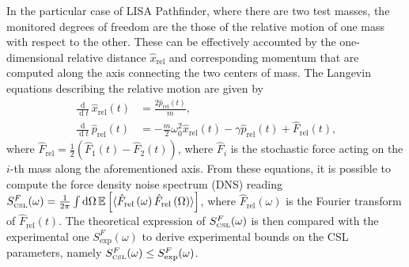 \documentclass[aps,twocolumn,pra,superscriptaddress]{revtex4-2}
\newcommand\D{\operatorname{d}\!}
\begin{document}
In the particular case of LISA Pathfinder, where there are two test masses, the monitored degrees of freedom are the those of the relative motion of one mass with respect to the other. These can be effectively accounted by the one-dimensional relative distance $\hat x_\text{rel}$ and corresponding momentum that are computed along the axis connecting the two centers of mass. The Langevin equations describing the relative motion are given by
\begin{equation}
    \begin{aligned}
\frac{\D}{\D t} \hat{x}_{\text {rel}}(t) & =\frac{2 \hat{p}_{\mathrm{rel}}(t)}{m}, \\
\frac{\D}{\D t} \hat{p}_{\text {rel}}(t) & =-\frac{m}{2} \omega_0^2 \hat{x}_{\text {rel}}(t)-\gamma \hat{p}_{\text {rel}}(t)+\hat F_{\text {rel}}(t),
\end{aligned}
\end{equation}
where $\hat F_{\text{rel}}=\frac{1}{2}(\hat F_1(t)-\hat F_2(t))$, where $\hat F_i$ is the stochastic force acting on the $i$-th mass along the aforementioned axis.
From these equations, it is possible to compute the force density noise spectrum (DNS) reading $S^{F}_\text{\tiny CSL}(\omega)=\frac{1}{2\pi}\int\D\Omega\,\mathbb{E}\left[\braket{ \hat F_{\text{rel}}\left(\omega\right)\hat F_{\text{rel}}\left(\Omega\right)}\right]$, where $\hat F_\text{rel}(\omega)$ is the Fourier transform of $\hat F_\text{rel}(t)$. The theoretical expression of $S^F_\text{\tiny CSL}(\omega)$ is then compared with the experimental one $S^F_\text{exp}(\omega)$ to derive experimental bounds on the CSL parameters, namely $S^F_\text{\tiny CSL}(\omega)\leq S^F_\text{exp}(\omega)$.
\end{document}
